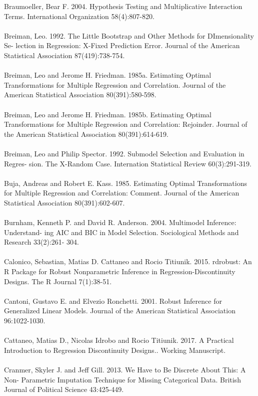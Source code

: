 \documentclass[letterpaper]{article}
\begin{document}
Braumoeller, Bear F. 2004. Hypothesis Testing and Multiplicative Interaction Terms. International Organization 58(4):807-820.
\\
\\
Breiman, Leo. 1992. The Little Bootstrap and Other Methods for DImensionality Se- lection in Regression: X-Fixed Prediction Error. Journal of the American Statistical Association 87(419):738-754.
\\
\\
Breiman, Leo and Jerome H. Friedman. 1985a. Estimating Optimal Transformations for Multiple Regression and Correlation. Journal of the American Statistical Association 80(391):580-598.
\\
\\
Breiman, Leo and Jerome H. Friedman. 1985b. Estimating Optimal Transformations for Multiple Regression and Correlation: Rejoinder. Journal of the American Statistical Association 80(391):614-619.
\\
\\
Breiman, Leo and Philip Spector. 1992. Submodel Selection and Evaluation in Regres- sion. The X-Random Case. Internation Statistical Review 60(3):291-319.
\\
\\
Buja, Andreas and Robert E. Kass. 1985. Estimating Optimal Transformations for Multiple Regression and Correlation: Comment. Journal of the American Statistical Association 80(391):602-607.
\\
\\
Burnham, Kenneth P. and David R. Anderson. 2004. Multimodel Inference: Understand- ing AIC and BIC in Model Selection. Sociological Methods and Research 33(2):261- 304.
\\
\\
Calonico, Sebastian, Matias D. Cattaneo and Rocio Titiunik. 2015. rdrobust: An R Package for Robust Nonparametric Inference in Regression-Discontinuity Designs. The R Journal 7(1):38-51.
\\
\\
Cantoni, Gustavo E. and Elvezio Ronchetti. 2001. Robust Inference for Generalized Linear Models. Journal of the American Statistical Association 96:1022-1030.
\\
\\
Cattaneo, Matias D., Nicolas Idrobo and Rocio Titiunik. 2017. A Practical Introduction to Regression Discontinuity Designs.. Working Manuscript.
\\
\\
Cranmer, Skyler J. and Jeff Gill. 2013. We Have to Be Discrete About This: A Non- Parametric Imputation Technique for Missing Categorical Data. British Journal of Political Science 43:425-449.
\end{document}
